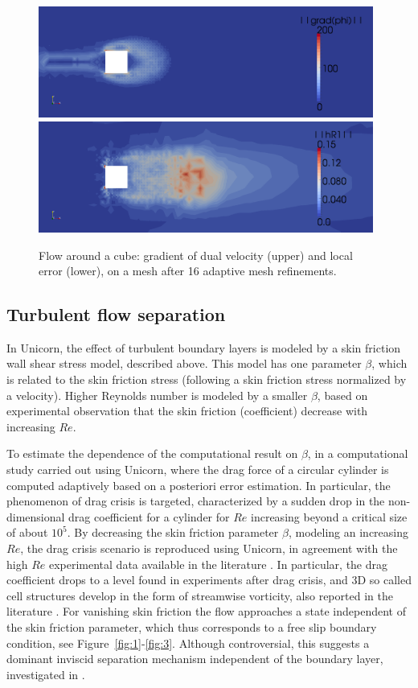 \begin{figure}
\centering
\includegraphics[width=11cm]{chapters/hoffman-1/png/fig3a.png}
\medskip
\includegraphics[width=11cm]{chapters/hoffman-1/png/fig3b.png}
\caption{Flow around a cube: gradient of dual velocity (upper) and local
error (lower), on a mesh after 16 adaptive mesh refinements.}
\label{fig:cube3}
\end{figure}


\subsection{Turbulent flow separation}

In Unicorn, the effect of turbulent boundary layers is modeled by a
skin friction wall shear stress model, described above. This model has
one parameter $\beta$, which is related to the skin friction stress
(following \citet{Schumann1975} a skin friction stress normalized by
a velocity). Higher Reynolds number is modeled by a smaller $\beta$,
based on experimental observation that the skin friction (coefficient)
decrease with increasing $Re$.

To estimate the dependence of the computational result on $\beta$,
in \citet{HoffmanJansson2009} a computational study carried out using
Unicorn, where the drag force of a circular cylinder is computed
adaptively based on a posteriori error estimation. In particular,
the phenomenon of drag crisis is targeted, characterized by a sudden
drop in the non-dimensional drag coefficient for a cylinder for $Re$
increasing beyond a critical size of about $10^5$. By decreasing
the skin friction parameter $\beta$, modeling an increasing $Re$,
the drag crisis scenario is reproduced using Unicorn, in agreement
with the high $Re$ experimental data available in the literature
\citep{Zdravkovich2003}. In particular, the drag coefficient drops
to a level found in experiments after drag crisis, and 3D so called
cell structures develop in the form of streamwise vorticity, also
reported in the literature \citep{Zdravkovich2003}.  For vanishing skin
friction the flow approaches a state independent of the skin friction
parameter, which thus corresponds to a free slip boundary condition, see
Figure~\ref{fig:1}-\ref{fig:3}. Although controversial, this suggests a
dominant inviscid separation mechanism independent of the boundary layer,
investigated in \citet{HoffmanJohnson2008b,HoffmanJansson2009}.

